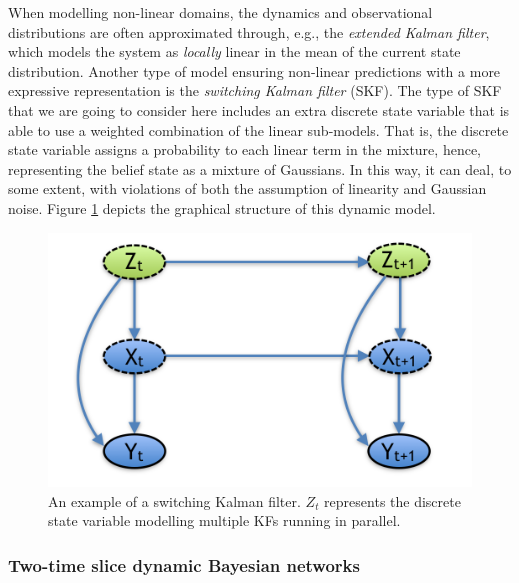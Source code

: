 When modelling non-linear domains, the dynamics and observational distributions are often approximated through, e.g., the \textit{extended Kalman filter}, which models the system as \textit{locally} linear in the mean of the current state distribution. Another type of model ensuring non-linear predictions with a more expressive representation is the \textit{switching Kalman filter} (SKF). The type of SKF that we are going to consider here includes an extra discrete state variable that is able to use a weighted combination of the linear sub-models. That is, the discrete state variable assigns a probability to each linear term in the mixture, hence, representing the belief state as a mixture of Gaussians. In this way, it can deal, to some extent, with violations of both the assumption of linearity and Gaussian noise. Figure \ref{Figure:SKF} depicts the graphical structure of this dynamic model.

\begin{figure}[ht!]
\begin{center}
\includegraphics[scale=0.4]{./figures/SKF}
\caption{\label{Figure:SKF} An example of a switching Kalman filter. $Z_t$ represents the discrete state variable modelling multiple KFs running in parallel.}
\end{center}
\end{figure}

\subsubsection{Two-time slice dynamic Bayesian networks}\label{SubSubSection:2DBNs}	

